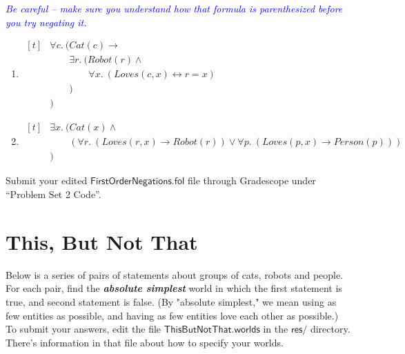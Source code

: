 \documentclass{article}
\renewcommand{\(}{\left(}
\renewcommand{\)}{\right)}
\theoremstyle{plain}
\theoremstyle{plain}
\theoremstyle{definition}
\newcommand{\annotate}[1]{\textit{\textcolor{blue}{#1}}}
\begin{document}
\annotate{Be careful -- make sure you understand how that formula is parenthesized before you try negating it.}

\begin{enumerate}[resume*]

\item
$\begin{aligned}[t]
&\forall c.\ (Cat(c) \rightarrow\\
&\qquad \exists r.\ (Robot(r) \land \\
&\qquad\qquad \forall x. \ (Loves(c, x) \leftrightarrow r=x)\\
&\qquad )\\
&)
\end{aligned}$

\item
$\begin{aligned}[t]
&\exists x.\ (Cat(x) \land \\
&\qquad (\forall r.\ (Loves(r, x) \rightarrow Robot(r)) \lor \forall p.\ (Loves(p, x) \rightarrow Person(p))) \\
&)
\end{aligned}$

\end{enumerate}
\begin{shaded}
  Submit your edited $\mathsf{FirstOrderNegations.fol}$ file
  through Gradescope under ``Problem Set 2 Code''.
\end{shaded}

\pagebreak


\section{This, But Not That}
Below is a series of pairs of statements about groups of cats, robots and people. For each pair, find the \textbf{\textit{absolute simplest}} world in which the first statement is true, and second statement is false. (By "absolute simplest," we mean using as few entities as possible, and having as few entities love each other as possible.)\\





To submit your answers, edit the file $\mathsf{ThisButNotThat.worlds}$ in the $\mathsf{res/}$ directory. There's information in that file about how to specify your worlds.\\\\
\end{document}
